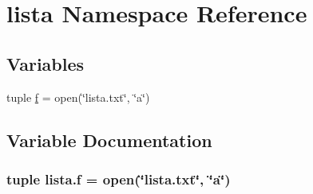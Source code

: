 \hypertarget{namespacelista}{\section{lista Namespace Reference}
\label{namespacelista}
}
\subsection*{Variables}
\begin{DoxyCompactItemize}
\item 
tuple \hyperlink{namespacelista_a0a55159595b1977a31f774e3b10e0f7a}{f} = open(\char`\"{}lista.\-txt\char`\"{}, \char`\"{}a\char`\"{})
\end{DoxyCompactItemize}


\subsection{Variable Documentation}
\hypertarget{namespacelista_a0a55159595b1977a31f774e3b10e0f7a}{
\subsubsection[{f}]{\setlength{\rightskip}{0pt plus 5cm}tuple lista.\-f = open(\char`\"{}lista.\-txt\char`\"{}, \char`\"{}a\char`\"{})}}\label{namespacelista_a0a55159595b1977a31f774e3b10e0f7a}
